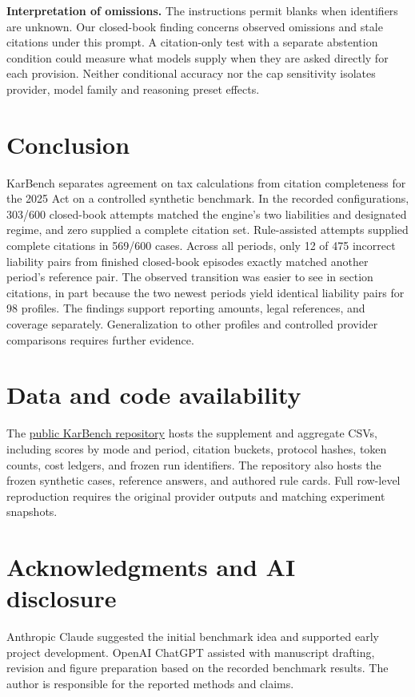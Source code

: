 \documentclass[10pt,letterpaper,twocolumn]{article}
\begin{document}
\textbf{Interpretation of omissions.} The instructions permit blanks when identifiers are unknown. Our closed-book finding concerns observed omissions and stale citations under this prompt. A citation-only test with a separate abstention condition could measure what models supply when they are asked directly for each provision. Neither conditional accuracy nor the cap sensitivity isolates provider, model family and reasoning preset effects.

\section{Conclusion}

KarBench separates agreement on tax calculations from citation completeness for the 2025 Act on a controlled synthetic benchmark. In the recorded configurations, 303/600 closed-book attempts matched the engine's two liabilities and designated regime, and zero supplied a complete citation set. Rule-assisted attempts supplied complete citations in 569/600 cases. Across all periods, only 12 of 475 incorrect liability pairs from finished closed-book episodes exactly matched another period's reference pair. The observed transition was easier to see in section citations, in part because the two newest periods yield identical liability pairs for 98 profiles. The findings support reporting amounts, legal references, and coverage separately. Generalization to other profiles and controlled provider comparisons requires further evidence.

\section*{Data and code availability}

The \href{https://github.com/Devrajsinh-Jhala/KarBench}{public KarBench repository} \cite{karbench} hosts the supplement and aggregate CSVs, including scores by mode and period, citation buckets, protocol hashes, token counts, cost ledgers, and frozen run identifiers. The repository also hosts the frozen synthetic cases, reference answers, and authored rule cards. Full row-level reproduction requires the original provider outputs and matching experiment snapshots.

\section*{Acknowledgments and AI disclosure}

Anthropic Claude \cite{claude} suggested the initial benchmark idea and supported early project development. OpenAI ChatGPT \cite{chatgpt} assisted with manuscript drafting, revision and figure preparation based on the recorded benchmark results. The author is responsible for the reported methods and claims.
\end{document}
